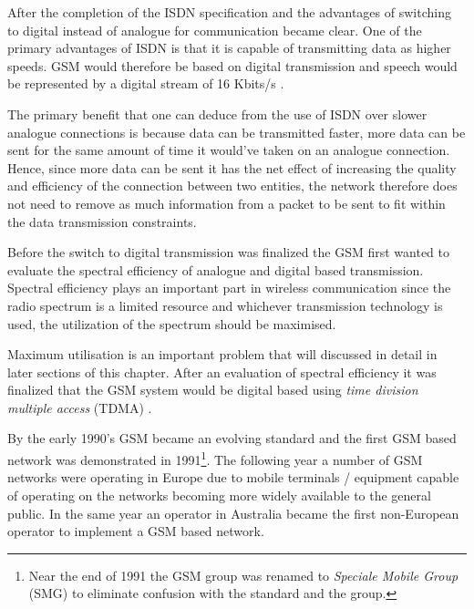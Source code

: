 After the completion of the ISDN specification and the advantages of switching to digital instead of analogue for communication became clear. One of the primary advantages of ISDN is that it is capable of transmitting data as higher speeds. GSM would therefore be based on digital transmission and speech would be represented by a digital stream of 16 Kbits/s \cite{GSM92}.

The primary benefit that one can deduce from the use of ISDN over slower analogue connections is because data can be transmitted faster, more data can be sent for the same amount of time it would've taken on an analogue connection. Hence, since more data can be sent it has the net effect of increasing the quality and efficiency of the connection between two entities, the network therefore does not need to remove as much information from a packet to be sent to fit within the data transmission constraints.

Before the switch to digital transmission was finalized the GSM first wanted to evaluate the spectral efficiency of analogue and digital based transmission. Spectral efficiency plays an important part in wireless communication since the radio spectrum is a limited resource and whichever transmission technology is used, the utilization of the spectrum should be maximised. 

Maximum utilisation is an important problem that will discussed in detail in later sections of this chapter. After an evaluation of spectral efficiency it was finalized that the GSM system would be digital based using \emph{time division multiple access} (TDMA) \cite{GSM92,GSMSysEngin}.

By the early 1990’s GSM became an evolving standard and the first GSM based network was demonstrated in 1991\footnote{Near the end of 1991 the GSM group was renamed to \emph{Speciale Mobile Group} (SMG) to eliminate confusion with the standard and the group.}. The following year a number of GSM networks were operating in Europe due to mobile terminals / equipment capable of operating on the networks becoming more widely available to the general public. In the same year an operator in Australia became the first non-European operator to implement a GSM based network\cite{Eisenblatter}.

